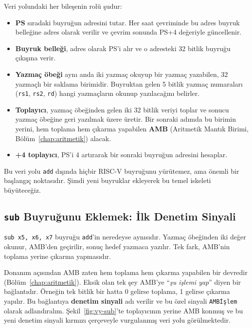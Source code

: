 Veri yolundaki her bileşenin rolü şudur:
\begin{itemize}
    \item \textbf{PS} sıradaki buyruğun adresini tutar. Her saat çevriminde bu adres buyruk belleğine adres olarak verilir ve çevrim sonunda PS+4 değeriyle güncellenir.
    \item \textbf{Buyruk belleği}, adres olarak PS'i alır ve o adresteki 32 bitlik buyruğu çıkışına verir.
    \item \textbf{Yazmaç öbeği} aynı anda iki yazmaç okuyup bir yazmaç yazabilen, 32 yazmaçlı bir saklama birimidir. Buyruktan gelen 5 bitlik yazmaç numaraları (\texttt{rs1}, \texttt{rs2}, \texttt{rd}) hangi yazmaçların okunup yazılacağını belirler.
    \item \textbf{Toplayıcı}, yazmaç öbeğinden gelen iki 32 bitlik veriyi toplar ve sonucu yazmaç öbeğine geri yazılmak üzere üretir. Bir sonraki adımda bu birimin yerini, hem toplama hem çıkarma yapabilen \textbf{AMB} (Aritmetik Mantık Birimi, Bölüm~\ref{chap:aritmetik}) alacak.
    \item \textbf{+4 toplayıcı}, PS'i 4 artırarak bir sonraki buyruğun adresini hesaplar.
\end{itemize}

Bu veri yolu \texttt{add} dışında hiçbir RISC-V buyruğunu yürütemez, ama önemli bir başlangıç noktasıdır. Şimdi yeni buyruklar ekleyerek bu temel iskeleti büyüteceğiz.

\subsection{\texttt{sub} Buyruğunu Eklemek: İlk Denetim Sinyali}
\label{subsec:vy-sub}

\texttt{sub x5, x6, x7} buyruğu \texttt{add}'in neredeyse aynısıdır. Yazmaç öbeğinden iki değer okunur, AMB'den geçirilir, sonuç hedef yazmaca yazılır. Tek fark, AMB'nin toplama yerine çıkarma yapmasıdır.

Donanım açısından AMB zaten hem toplama hem çıkarma yapabilen bir devredir (Bölüm~\ref{chap:aritmetik}). Eksik olan tek şey AMB'ye ``\emph{şu işlemi yap}'' diyen bir bağlantıdır. Örneğin tek bitlik bir hatta 0 gelirse toplama, 1 gelirse çıkarma yapılır. Bu bağlantıya \textbf{denetim sinyali} adı verilir ve bu özel sinyali \texttt{AMBİşlem} olarak adlandıralım. Şekil~\ref{fig:vy-sub}'te toplayıcının yerine AMB konmuş ve bu yeni denetim sinyali kırmızı çerçeveyle vurgulanmış veri yolu görülmektedir.

